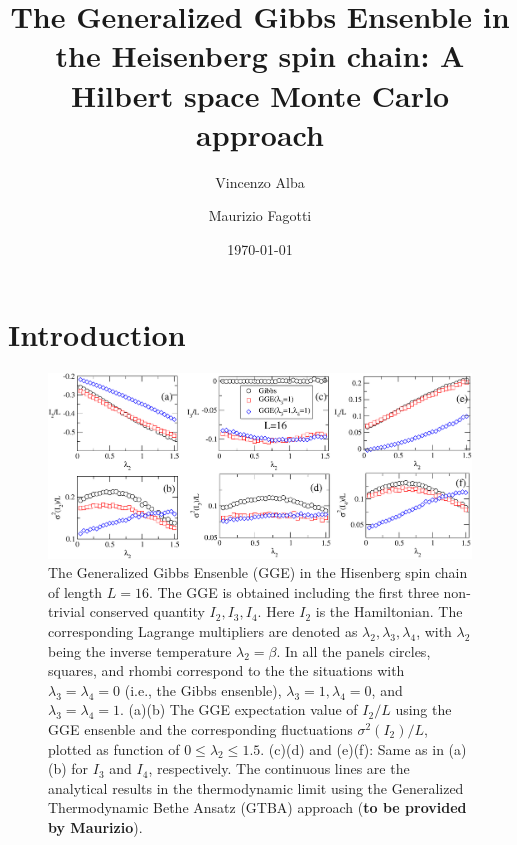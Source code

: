 \documentclass[twocolumn,superscriptaddress,prb,10pt]{revtex4-1}
\begin{document}
\title{The Generalized Gibbs Ensenble in the Heisenberg spin chain: A Hilbert space Monte Carlo 
approach} 

\author{Vincenzo Alba}

\author{Maurizio Fagotti}

\date{\today}




\begin{abstract} 


\end{abstract}


\maketitle


\section{Introduction}

\begin{figure}[t]
\includegraphics*[width=0.93\linewidth]{./draft_figs/fig1}
\caption{The Generalized Gibbs Ensenble (GGE) in the Hisenberg spin chain of 
 length $L=16$. The GGE is obtained including the first three non-trivial 
 conserved quantity $I_2, I_3,I_4$. Here $I_2$ is the Hamiltonian. The corresponding 
 Lagrange multipliers are denoted as $\lambda_2,\lambda_3,\lambda_4$, with $\lambda_2$ 
 being the inverse temperature $\lambda_2=\beta$. In all the panels circles, squares, 
 and rhombi correspond to the the situations with $\lambda_3=\lambda_4=0$ 
 (i.e., the Gibbs ensenble), $\lambda_3=1,\lambda_4=0$, and $\lambda_3=\lambda_4=1$.
 (a)(b) The GGE expectation value of $I_2/L$ using the GGE ensenble and the  corresponding 
 fluctuations $\sigma^2(I_2)/L$, plotted as function of $0\le\lambda_2\le 1.5$. (c)(d) 
 and (e)(f): Same as in (a)(b) for $I_3$ and $I_4$, respectively. The continuous lines 
 are the analytical results in the thermodynamic limit using the Generalized Thermodynamic 
 Bethe Ansatz (GTBA) approach ({\bf to be provided by Maurizio}).
}
\label{fig1}
\end{figure}
\end{document}
